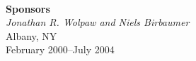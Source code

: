 \begin{titlepage}
\begin{minipage}{\textwidth}
\begin{center}
\begin{minipage}{13cm}
\begin{minipage}[c]{3cm}
  \end{minipage}
\end{minipage}
%
\\[1.5cm]
\textbf{Sponsors} \\
\textit{Jonathan R. Wolpaw and Niels Birbaumer}
\\[1.0cm]
{Albany, NY} \\[1ex]
{February 2000--July 2004}
\end{center}
\end{minipage}
\end{titlepage}
